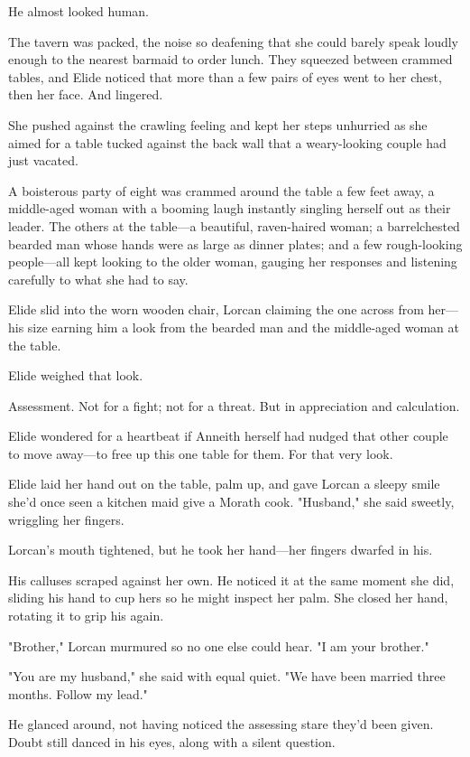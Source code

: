 He almost looked human.

The tavern was packed, the noise so deafening that she could barely speak loudly enough to the nearest barmaid to order lunch. They squeezed between crammed tables, and Elide noticed that more than a few pairs of eyes went to her chest, then her face. And lingered.

She pushed against the crawling feeling and kept her steps unhurried as she aimed for a table tucked against the back wall that a weary-looking couple had just vacated.

A boisterous party of eight was crammed around the table a few feet away, a middle-aged woman with a booming laugh instantly singling herself out as their leader. The others at the table---a beautiful, raven-haired woman; a barrelchested bearded man whose hands were as large as dinner plates; and a few rough-looking people---all kept looking to the older woman, gauging her responses and listening carefully to what she had to say.

Elide slid into the worn wooden chair, Lorcan claiming the one across from her---his size earning him a look from the bearded man and the middle-aged woman at the table.

Elide weighed that look.

Assessment. Not for a fight; not for a threat. But in appreciation and calculation.

Elide wondered for a heartbeat if Anneith herself had nudged that other couple to move away---to free up this one table for them. For that very look.

Elide laid her hand out on the table, palm up, and gave Lorcan a sleepy smile she'd once seen a kitchen maid give a Morath cook. "Husband," she said sweetly, wriggling her fingers.

Lorcan's mouth tightened, but he took her hand---her fingers dwarfed in his.

His calluses scraped against her own. He noticed it at the same moment she did, sliding his hand to cup hers so he might inspect her palm. She closed her hand, rotating it to grip his again.

"Brother," Lorcan murmured so no one else could hear. "I am your brother."

"You are my husband," she said with equal quiet. "We have been married three months. Follow my lead."

He glanced around, not having noticed the assessing stare they'd been given. Doubt still danced in his eyes, along with a silent question.

